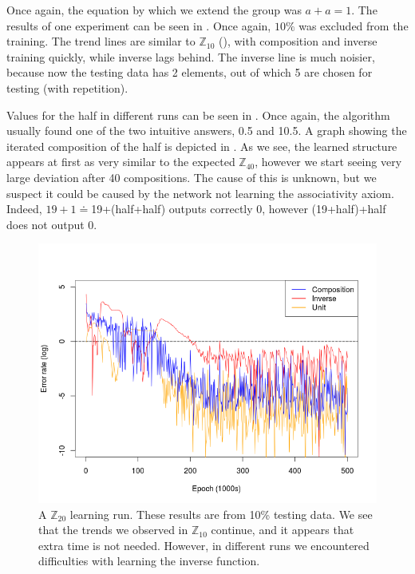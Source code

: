 Once again, the equation by which we extend the group was $a+a=1$. The results of one experiment can be seen in . Once again, $10\%$ was excluded from the training. The trend lines are similar to $\mathbb{Z}_{10}$ (), with composition and inverse training quickly, while inverse lags behind. The inverse line is much noisier, because now the testing data has 2 elements, out of which 5 are chosen for testing (with repetition).

Values for the half in different runs can be seen in . Once again, the algorithm usually found one of the two intuitive answers, 0.5 and 10.5. A graph showing the iterated composition of the half is depicted in . As we see, the learned structure appears at first as very similar to the expected $\mathbb{Z}_{40}$, however we start seeing very large deviation after 40 compositions. The cause of this is unknown, but we suspect it could be caused by the network not learning the associativity axiom. Indeed, $19+1\doteq$19+(half+half) outputs correctly $0$, however (19+half)+half does not output 0.

\begin{figure}[h]
\centering
\caption{A $\mathbb{Z}_{20}$ learning run. These results are from 10\% testing data. We see that the trends we observed in $\mathbb{Z}_{10}$ continue, and it appears that extra time is not needed. However, in different runs we encountered difficulties with learning the inverse function.}
\label{graph:z20_90percent}
\includegraphics[width=\linewidth]{../img/z20_90percent.png}
\end{figure}

